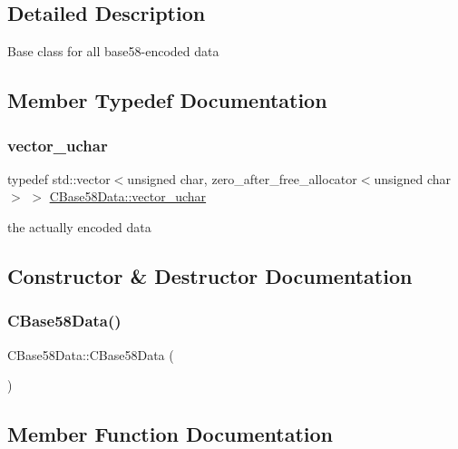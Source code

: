 \subsection{Detailed Description}
Base class for all base58-\/encoded data 

\subsection{Member Typedef Documentation}
\mbox{\label{class_c_base58_data_a193d64487a0b4f6df24f8bd380956ec1}} 
\subsubsection{\texorpdfstring{vector\+\_\+uchar}{vector\_uchar}}
{\footnotesize\ttfamily typedef std\+::vector$<$unsigned char, zero\+\_\+after\+\_\+free\+\_\+allocator$<$unsigned char$>$ $>$ \mbox{\hyperlink{class_c_base58_data_a193d64487a0b4f6df24f8bd380956ec1}{C\+Base58\+Data\+::vector\+\_\+uchar}}\hspace{0.3cm}{\ttfamily [protected]}}



the actually encoded data 



\subsection{Constructor \& Destructor Documentation}
\mbox{\label{class_c_base58_data_ae4f4ff42010299bc6fb228e21d6b2a15}} 
\subsubsection{\texorpdfstring{C\+Base58\+Data()}{CBase58Data()}}
{\footnotesize\ttfamily C\+Base58\+Data\+::\+C\+Base58\+Data (\begin{DoxyParamCaption}{ }\end{DoxyParamCaption})\hspace{0.3cm}{\ttfamily [protected]}}



\subsection{Member Function Documentation}
\mbox{\label{class_c_base58_data_ad89d6bd7afa8d831dffce12803c5f58d}} 
